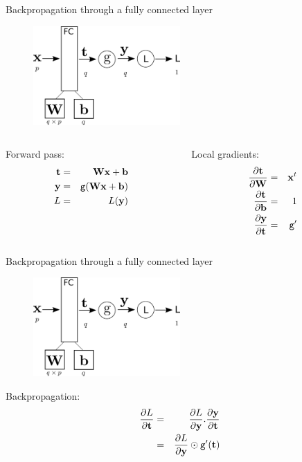 \documentclass[xcolor=pdftex,dvipsnames,table,mathserif]{beamer}
\begin{document}
\begin{frame}{Backpropagation through a fully connected layer}
\begin{figure}
\includegraphics[width=0.5\textwidth]{../graphics/bp_fc.png}
\end{figure}

\begin{columns}
  \begin{column}{0.5\textwidth}
    Forward pass:
    \begin{eqnarray*}
      \mathbf{t} &=& \mathbf{W}\mathbf{x} + \mathbf{b} \\
      \mathbf{y} &=& \texttt{g}(\mathbf{W}\mathbf{x} + \mathbf{b}) \\
      L &=& L(\mathbf{y})
    \end{eqnarray*}
  \end{column}

  \begin{column}{0.5\textwidth}
    Local gradients:
    \begin{eqnarray*}
      \pdv{\mathbf{t}}{\mathbf{W}} &=& \mathbf{x}^t \\
      \pdv{\mathbf{t}}{\mathbf{b}} &=& 1 \\
      \pdv{\mathbf{y}}{\mathbf{t}} &=& \texttt{g}'
    \end{eqnarray*}
  \end{column}
\end{columns}

\end{frame}

\begin{frame}{Backpropagation through a fully connected layer}
  \begin{figure}
    \includegraphics[width=0.5\textwidth]{../graphics/bp_fc.png}
  \end{figure}

  Backpropagation:
  \begin{eqnarray*}
    \pdv{L}{\mathbf{t}} &=& \pdv{L}{\mathbf{y}}.\pdv{\mathbf{y}}{\mathbf{t}} \\
                           &=& \pdv{L}{\mathbf{y}} \odot \texttt{g}'(\mathbf{t}) \\
  \end{eqnarray*}

\end{frame}
\end{document}
